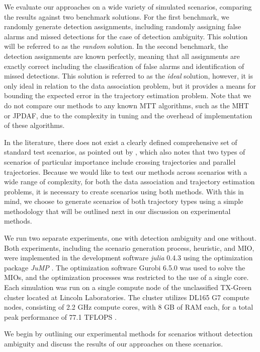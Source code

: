 We evaluate our approaches on a wide variety of simulated scenarios, comparing the results against two benchmark solutions. For the first benchmark, we randomly generate detection assignments, including randomly assigning false alarms and missed detections for the case of detection ambiguity. This solution will be referred to as the \textit{random} solution. In the second benchmark, the detection assignments are known perfectly, meaning that all assignments are exactly correct including the classification of false alarms and identification of missed detections. This solution is referred to as the \textit{ideal} solution, however, it is only ideal in relation to the data association problem, but it provides a means for bounding the expected error in the trajectory estimation problem. Note that we do not compare our methods to any known MTT algorithms, such as the MHT or JPDAF, due to the complexity in tuning and the overhead of implementation of these algorithms. 

In the literature, there does not exist a clearly defined comprehensive set of standard test scenarios, as pointed out by \cite{MTT-Taxonomy}, which also notes that two types of scenarios of particular importance include crossing trajectories and parallel trajectories. Because we would like to test our methods across scenarios with a wide range of complexity, for both the data association and trajectory estimation problems, it is necessary to create scenarios using both methods. With this in mind, we choose to generate scenarios of both trajectory types using a simple methodology that will be outlined next in our discussion on experimental methods. 

We run two separate experiments, one with detection ambiguity and one without. Both experiments, including the scenario generation process, heuristic, and MIO, were implemented in the development software \textit{julia} 0.4.3 \cite{julia} using the optimization package \textit{JuMP} \cite{JuMP}. The optimization software Gurobi 6.5.0 \cite{gurobi} was used to solve the MIOs, and the optimization processes was restricted to the use of a single core. Each simulation was run on a single compute node of the unclassified TX-Green cluster located at Lincoln Laboratories. The cluster utilizes DL165 G7 compute nodes, consisting of 2.2 GHz compute cores, with 8 GB of RAM each, for a total peak performance of 77.1 TFLOPS \cite{LLGrid}. 

We begin by outlining our experimental methods for scenarios without detection ambiguity and discuss the results of our approaches on these scenarios. 

